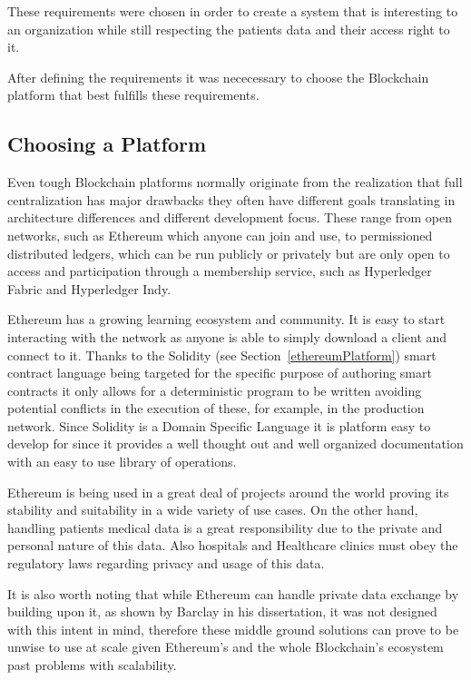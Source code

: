 These requirements were chosen in order to create a system that is interesting
to an organization while still respecting the patients data and their access
right to it. 

After defining the requirements it was nececessary to choose the Blockchain
platform that best fulfills these requirements.

\subsection{Choosing a Platform}\label{choosePlatform}

Even tough Blockchain platforms normally originate from the realization that
full centralization has major drawbacks they often have different goals
translating in architecture differences and different development focus.  These
range from open networks, such as Ethereum which anyone can join and use, to
permissioned distributed ledgers, which can be run publicly or privately but
are only open to access and participation through a membership service, such as
Hyperledger Fabric and Hyperledger Indy.

Ethereum has a growing learning ecosystem and community. It is easy to start
interacting with the network as anyone is able to simply download a client and
connect to it. Thanks to the Solidity (see Section~\ref{ethereumPlatform})
smart contract language being targeted for the specific purpose of authoring
smart contracts it only allows for a deterministic program to be written
avoiding potential conflicts in the execution of these, for example, in the
production network. Since Solidity is a Domain Specific Language it is platform
easy to develop for since it provides a well thought out and well organized
documentation with an easy to use library of operations.

Ethereum is being used in a great deal of projects around the world proving its
stability and suitability in a wide variety of use cases. On the other hand,
handling patients medical data is a great responsibility due to the private and
personal nature of this data. Also hospitals and Healthcare clinics must obey
the regulatory laws regarding privacy and usage of this data.

It is also worth noting that while Ethereum can handle private data exchange by
building upon it, as shown by Barclay in his dissertation, it was not designed
with this intent in mind, therefore these middle ground solutions can prove to
be unwise to use at scale given Ethereum's and the whole Blockchain's ecosystem
past problems with scalability.  


